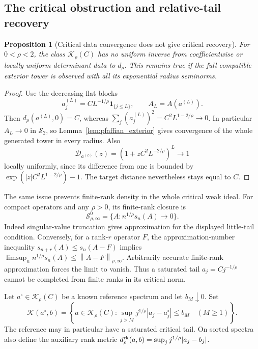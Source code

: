 \documentclass[11pt,a4paper]{amsart}
\numberwithin{equation}{section}
\newtheorem{proposition}[theorem]{Proposition}
\theoremstyle{definition}
\theoremstyle{remark}
\newcommand{\Sch}{\mathcal S}
\newcommand{\norm}[1]{\left\lVert#1\right\rVert}
\begin{document}
\subsection{The critical obstruction and relative-tail recovery}
\begin{proposition}[Critical data convergence does not give critical recovery]\label{prop:pfaffian_critical_failure}
For $0<\rho<2$, the class $\mathcal K_\rho(C)$ has no uniform inverse from coefficientwise or locally uniform determinant data to $d_\rho$. This remains true if the full compatible exterior tower is observed with all its exponential radius seminorms.
\end{proposition}
\begin{proof}
Use the decreasing flat blocks
\[
 a_j^{(L)}=CL^{-1/\rho}\mathbf1_{\{j\le L\}},\qquad A_L=A(a^{(L)}).
\]
Then $d_\rho(a^{(L)},0)=C$, whereas
$\sum_j(a_j^{(L)})^2=C^2L^{1-2/\rho}\to0$. In particular $A_L\to0$ in $\Sch_2$, so Lemma~\ref{lem:pfaffian_exterior} gives convergence of the whole generated tower in every radius. Also
\[
 \mathscr D_{a^{(L)}}(z)=(1+zC^2L^{-2/\rho})^L\longrightarrow1
\]
locally uniformly, since its difference from one is bounded by
$\exp(|z|C^2L^{1-2/\rho})-1$. The target distance nevertheless stays equal to $C$.
\end{proof}

The same issue prevents finite-rank density in the whole critical weak ideal. For compact operators and any $\rho>0$, its finite-rank closure is
\begin{equation}\label{eq:pfaffian_little_ideal}
 \Sch_{\rho,\infty}^0=\{A:n^{1/\rho}s_n(A)\longrightarrow0\}.
\end{equation}
Indeed singular-value truncation gives approximation for the displayed little-tail condition. Conversely, for a rank-$r$ operator $F$, the approximation-number inequality
$s_{n+r}(A)\le s_n(A-F)$ implies
$\limsup_n n^{1/\rho}s_n(A)\le\norm{A-F}_{\rho,\infty}$.
Arbitrarily accurate finite-rank approximation forces the limit to vanish. Thus a saturated tail $a_j=Cj^{-1/\rho}$ cannot be completed from finite ranks in its critical norm.

Let $a^\circ\in\mathcal K_\rho(C)$ be a known reference spectrum and let $b_M\downarrow0$. Set
\begin{equation}\label{eq:pfaffian_relative_class}
 \mathcal K(a^\circ,b)=\left\{a\in\mathcal K_\rho(C):
 \sup_{j>M}j^{1/\rho}|a_j-a_j^\circ|\le b_M\quad(M\ge1)\right\}.
\end{equation}
The reference may in particular have a saturated critical tail. On sorted spectra also define the auxiliary rank metric
$d_\rho^{\rm rk}(a,b)=\sup_jj^{1/\rho}|a_j-b_j|$.
\end{document}

